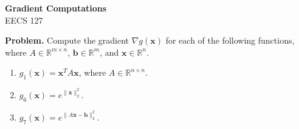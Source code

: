 \documentclass[9pt]{article}
\begin{document}
\begin{center}
  {\LARGE \textbf{Gradient Computations}} \\[6pt]
  {\normalsize EECS 127} \\[10pt]
\end{center}

\vspace{4pt}

\begin{axiombox}
\textbf{Problem.} \; Compute the gradient $\nabla g(\mathbf{x})$ for each of the following functions, where $A \in \mathbb{R}^{m \times n}$, $\mathbf{b} \in \mathbb{R}^m$, and $\mathbf{x} \in \mathbb{R}^n$.

\begin{enumerate}[label=(\alph*), itemsep=3pt]
  \item $g_1(\mathbf{x}) = \mathbf{x}^T A \mathbf{x}$, where $A \in \mathbb{R}^{n \times n}$.
  \item $g_6(\mathbf{x}) = e^{\|\mathbf{x}\|_2^2}$.
  \item $g_7(\mathbf{x}) = e^{\|A\mathbf{x} - \mathbf{b}\|_2^2}$.
\end{enumerate}
\end{axiombox}

\vspace{8pt}
\end{document}
